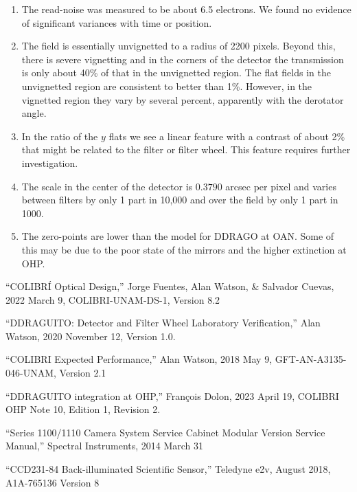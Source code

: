 \documentclass{article}
\begin{document}
\begin{enumerate}
\item The read-noise was measured to be about 6.5 electrons. We found no evidence of significant variances with time or position.

\item The field is essentially unvignetted to a radius of 2200 pixels. Beyond this, there is severe vignetting and in the corners of the detector the transmission is only about 40\% of that in the unvignetted region. The flat fields in the unvignetted region are consistent to better than 1\%. However, in the vignetted region they vary by several percent, apparently with the derotator angle. 

\item In the ratio of the $y$ flats we see a linear feature with a contrast of about 2\% that might be related to the filter or filter wheel. This feature requires further investigation.

\item The scale in the center of the detector is $0.3790$ arcsec per pixel and varies between filters by only 1 part in 10,000 and over the field by only 1 part in 1000.

\item The zero-points are lower than the model for DDRAGO at OAN. Some of this may be due to the poor state of the mirrors and the higher extinction at OHP.
\end{enumerate}



\clearpage
\begin{thebibliography}{Te2v}

“COLIBRÍ Optical Design,” Jorge Fuentes, Alan Watson, \& Salvador Cuevas, 2022 March 9, COLIBRI-UNAM-DS-1, Version 8.2

“DDRAGUITO: Detector and Filter Wheel Laboratory Verification,” Alan Watson, 2020 November 12, Version 1.0.

“COLIBRI Expected Performance,” Alan Watson, 2018 May 9, GFT-AN-A3135-046-UNAM, Version 2.1

“DDRAGUITO integration at OHP,” François Dolon, 2023 April 19, COLIBRI OHP Note 10, Edition 1, Revision 2.

“Series 1100/1110 Camera System Service Cabinet Modular Version Service Manual,” Spectral Instruments, 2014 March 31

“CCD231-84 Back-illuminated Scientific Sensor,” Teledyne e2v, August 2018, A1A-765136 Version 8

\end{thebibliography}
\end{document}
